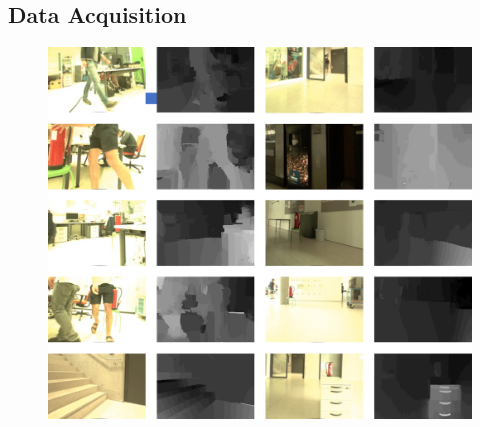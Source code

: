 \subsection{Data Acquisition}
\label{sec::523_da}
\begin{figure}[h]
	\centering
	\includegraphics[scale=.4]{chapters/05_experiments/02_autonomous_walking/dataset_diversity.png}
	\caption{}
	\label{fig::523_dataset}
\end{figure}
